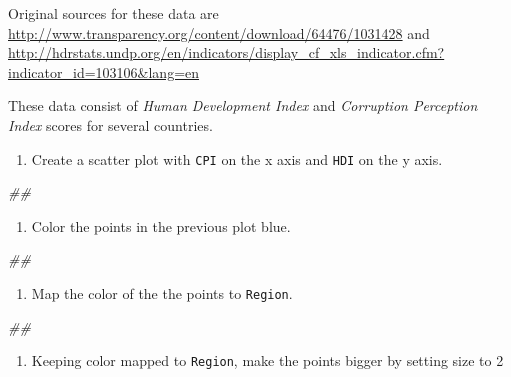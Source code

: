 \documentclass[
]{book}
\newenvironment{Shaded}{\begin{snugshade}}{\end{snugshade}}
\newcommand{\CommentTok}[1]{\textcolor[rgb]{0.56,0.35,0.01}{\textit{#1}}}
\providecommand{\tightlist}{%
  \setlength{\itemsep}{0pt}\setlength{\parskip}{0pt}}
\begin{document}
Original sources for these data are \url{http://www.transparency.org/content/download/64476/1031428} and \url{http://hdrstats.undp.org/en/indicators/display_cf_xls_indicator.cfm?indicator_id=103106\&lang=en}

These data consist of \emph{Human Development Index} and \emph{Corruption Perception Index} scores for several countries.

\begin{enumerate}
\def\labelenumi{\arabic{enumi}.}
\tightlist
\item
  Create a scatter plot with \texttt{CPI} on the x axis and \texttt{HDI} on the y axis.
\end{enumerate}

\begin{Shaded}
\begin{Highlighting}[]
\CommentTok{\#\# }
\end{Highlighting}
\end{Shaded}

\begin{enumerate}
\def\labelenumi{\arabic{enumi}.}
\setcounter{enumi}{1}
\tightlist
\item
  Color the points in the previous plot blue.
\end{enumerate}

\begin{Shaded}
\begin{Highlighting}[]
\CommentTok{\#\# }
\end{Highlighting}
\end{Shaded}

\begin{enumerate}
\def\labelenumi{\arabic{enumi}.}
\setcounter{enumi}{2}
\tightlist
\item
  Map the color of the the points to \texttt{Region}.
\end{enumerate}

\begin{Shaded}
\begin{Highlighting}[]
\CommentTok{\#\# }
\end{Highlighting}
\end{Shaded}

\begin{enumerate}
\def\labelenumi{\arabic{enumi}.}
\setcounter{enumi}{3}
\tightlist
\item
  Keeping color mapped to \texttt{Region}, make the points bigger by setting size to 2
\end{enumerate}
\end{document}
